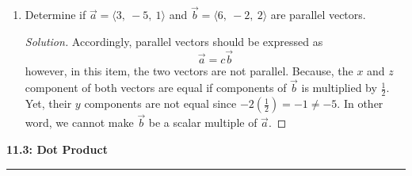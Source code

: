 \documentclass[12pt]{article}
\begin{document}
\begin{enumerate}
		\item[5.)] Determine if \(\vec{a} = \langle 3,~-5,~1\rangle\) and \(\vec{b} = \langle 6,~-2,~2\rangle\) are parallel vectors.
			\begin{proof}[Solution]
				Accordingly, parallel vectors should be expressed as
				\[\vec{a} = c\vec{b}\]
				however, in this item, the two vectors are not parallel. Because, the \(x\) and \(z\) component of both vectors are equal if components of \(\vec{b}\) is multiplied by \(\displaystyle \frac{1}{2}\). Yet, their \(y\) components are not equal since \(\displaystyle -2\left(\frac{1}{2}\right) = -1 \neq -5\). In other word, we cannot make \(\vec{b}\) be a scalar multiple of \(\vec{a}\).
			\end{proof}
	\end{enumerate}
	
	\noindent
	{\Large \textbf{11.3: Dot Product}} \\
	\hrule
\end{document}
